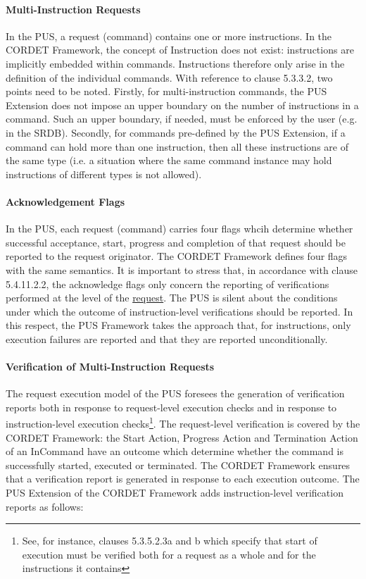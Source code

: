 \documentclass[a4paper,10pt]{article}
\begin{document}
\paragraph{Multi-Instruction Requests}
In the PUS, a request (command) contains one or more instructions. In the CORDET Framework, the concept of Instruction does not exist: instructions are implicitly embedded within commands. Instructions therefore only arise in the definition of the individual commands. With reference to clause 5.3.3.2, two points need to be noted. Firstly, for multi-instruction commands, the PUS Extension does not impose an upper boundary on the number of instructions in a command. Such an upper boundary, if needed, must be enforced by the user (e.g. in the SRDB). Secondly, for commands pre-defined by the PUS Extension, if a command can hold more than one instruction, then all these instructions are of the same type (i.e. a situation where the same command instance may hold instructions of different types is not allowed). 

\paragraph{Acknowledgement Flags} In the PUS, each request (command) carries four flags whcih determine whether successful acceptance, start, progress and completion of that request should be reported to the request originator. The CORDET Framework defines four flags with the same semantics. It is important to stress that, in accordance with clause 5.4.11.2.2, the acknowledge flags only concern the reporting of verifications performed at the level of the \underline{request}. The PUS is silent about the conditions under which the outcome of instruction-level verifications should be reported. In this respect, the PUS Framework takes the  approach that, for instructions, only execution failures are reported and that they are reported unconditionally. 


\paragraph{Verification of Multi-Instruction Requests}
The request execution model of the PUS foresees the generation of verification reports both in response to request-level execution checks and in response to instruction-level execution checks\footnote{See, for instance, clauses 5.3.5.2.3a and b which specify that start of execution must be verified both for a request as a whole and for the instructions it contains}. The request-level verification is covered by the CORDET Framework: the Start Action, Progress Action and Termination Action of an InCommand have an outcome which determine whether the command is successfully started, executed or terminated. The CORDET Framework ensures that a verification report is generated in response to each execution outcome. The PUS Extension of the CORDET Framework adds instruction-level verification reports as follows:
\end{document}
